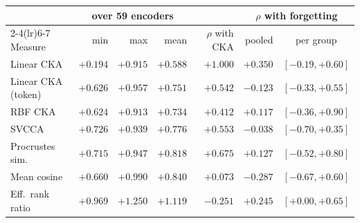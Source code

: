 \centering
\small
\begin{tabular}{lrrrrrc}
\toprule
 & \multicolumn{3}{c}{over 59 encoders} & & \multicolumn{2}{c}{$\rho$ with forgetting} \\
\cmidrule(lr){2-4}\cmidrule(lr){6-7}
Measure & min & max & mean & $\rho$ with CKA & pooled & per group \\
\midrule
Linear CKA & $+0.194$ & $+0.915$ & $+0.588$ & $+1.000$ & $+0.350$ & $[-0.19,+0.60]$ \\
Linear CKA (token) & $+0.626$ & $+0.957$ & $+0.751$ & $+0.542$ & $-0.123$ & $[-0.33,+0.55]$ \\
RBF CKA & $+0.624$ & $+0.913$ & $+0.734$ & $+0.412$ & $+0.117$ & $[-0.36,+0.90]$ \\
SVCCA & $+0.726$ & $+0.939$ & $+0.776$ & $+0.553$ & $-0.038$ & $[-0.70,+0.35]$ \\
Procrustes sim. & $+0.715$ & $+0.947$ & $+0.818$ & $+0.675$ & $+0.127$ & $[-0.52,+0.80]$ \\
Mean cosine & $+0.660$ & $+0.990$ & $+0.840$ & $+0.073$ & $-0.287$ & $[-0.67,+0.60]$ \\
Eff.\ rank ratio & $+0.969$ & $+1.250$ & $+1.119$ & $-0.251$ & $+0.245$ & $[+0.00,+0.65]$ \\
\bottomrule
\end{tabular}

